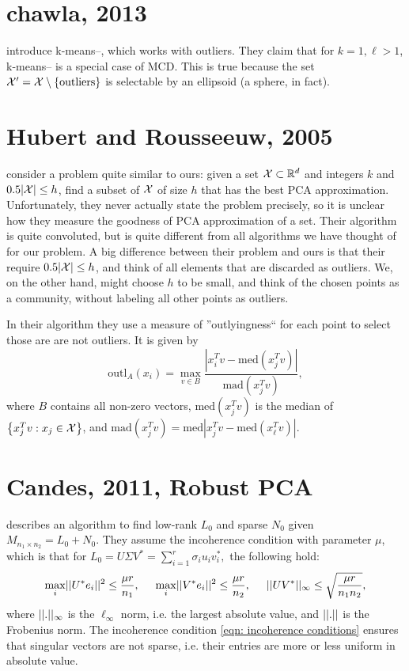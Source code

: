 \documentclass{article}
\begin{document}
\section{chawla, 2013}
\cite{chawla2013k} introduce k-means--, which works with outliers. They claim that for $k=1, \ell>1$, k-means-- is a special case of MCD. This is true because the set $\mathcal{X}' = \mathcal{X} \setminus \text{\{outliers\}}$ is selectable by an ellipsoid (a sphere, in fact). 

\section{Hubert and Rousseeuw, 2005}
\cite{hubert2005robpca} consider a problem quite similar to ours: given a set $\mathcal{X} \subset \mathbb{R}^d$ and integers $k$ and $0.5 |\mathcal{X}| \leq h$, find a subset of $\mathcal{X}$ of size $h$ that has the best PCA approximation. Unfortunately, they never actually state the problem precisely, so it is unclear how they measure the goodness of PCA approximation of a set. Their algorithm is quite convoluted, but is quite different from all algorithms we have thought of for our problem. A big difference between their problem and ours is that their require $0.5 |\mathcal{X}| \leq h$, and think of all elements that are discarded as outliers. We, on the other hand, might choose $h$ to be small, and think of the chosen points as a community, without labeling all other points as outliers.

In their algorithm they use a measure of ''outlyingness`` for each point to select those are are not outliers. It is given by 
$$\text{outl}_A(x_i) = \max_{v\in B} \frac{|x_i^T v - \text{med}(x_j^T v)|}{\text{mad}(x_j^T v)},$$
where $B$ contains all non-zero vectors, $\text{med}(x_j^T v)$ is the median of $\left\{x_j^T v : x_j \in \mathcal{X}\right\}$, and $\text{mad}(x_j^T v) = \text{med}|x_j^T v - \text{med}(x_{\ell}^T v)|.$

\section{Candes, 2011, Robust PCA}
\cite{candes2011robust} describes an algorithm to find low-rank $L_0$ and sparse $N_0$ given $M_{n_1 \times n_2} = L_0 + N_0$. They assume the incoherence condition with parameter $\mu$, which is that for $L_0 = U\Sigma V^* = \sum_{i=1}^r \sigma_i u_i v_i^*,$ the following hold:
\begin{equation}\label{eqn: incoherence conditions}
    \max_i \norm{U^* e_i}^2 \leq \frac{\mu r}{n_1},\hspace{0.5cm} \max_i \norm{V^* e_i}^2 \leq \frac{\mu r}{n_2},\hspace{0.5cm} \norm{U V^*}_\infty \leq \sqrt{\frac{\mu r}{n_1 n_2}},
\end{equation}
where $||.||_\infty$ is the $\ell_\infty$ norm, i.e. the largest absolute value, and $||.||$ is the Frobenius norm. The incoherence condition \ref{eqn: incoherence conditions} ensures that singular vectors are not sparse, i.e. their entries are more or less uniform in absolute value.
\end{document}

